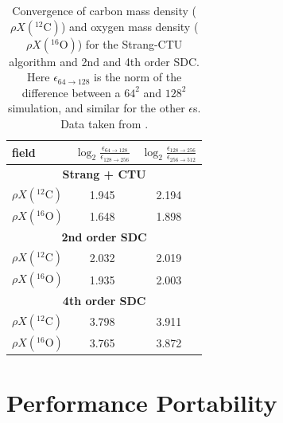 \documentclass[a4paper]{jpconf}
\newcommand{\isotm}[2]{{}^{#2}\mathrm{#1}}
\begin{document}
\begin{table}[t]
\renewcommand{\arraystretch}{1.25}
\centering
\begin{tabular}{lcc}
{\bf field} & {$\log_2 \frac{\epsilon_{64 \rightarrow 128}}{\epsilon_{128\rightarrow 256}}$} &
{$\log_2 \frac{\epsilon_{128\rightarrow 256}}{\epsilon_{256\rightarrow 512}}$} \\[0.5em]
\hline
\multicolumn{3}{c}{\bf Strang + CTU} \\
\hline
 $\rho X(\isotm{C}{12})$     & 1.945  & 2.194  \\
 $\rho X(\isotm{O}{16})$     & 1.648  & 1.898  \\
\hline
\multicolumn{3}{c}{\bf 2nd order SDC} \\
\hline
 $\rho X(\isotm{C}{12})$     & 2.032  & 2.019  \\
 $\rho X(\isotm{O}{16})$     & 1.935  & 2.003  \\
\hline
\multicolumn{3}{c}{\bf 4th order SDC} \\
\hline
 $\rho X(\isotm{C}{12})$     & 3.798  & 3.911  \\
 $\rho X(\isotm{O}{16})$     & 3.765  & 3.872  \\
\hline
\end{tabular}
\renewcommand{\arraystretch}{1.0}
\caption{\label{table:convergence} Convergence of carbon mass density
  ($\rho X(\isotm{C}{12})$) and oxygen mass density ($\rho
  X(\isotm{O}{16})$) for the Strang-CTU algorithm and 2nd and 4th
  order SDC.  Here $\epsilon_{64\rightarrow 128}$ is the norm of the 
  difference between a $64^2$ and $128^2$ simulation, and similar for the other $\epsilon$s.  Data taken from \cite{castro:sdc}.}
\end{table}

\section{Performance Portability}
\end{document}
